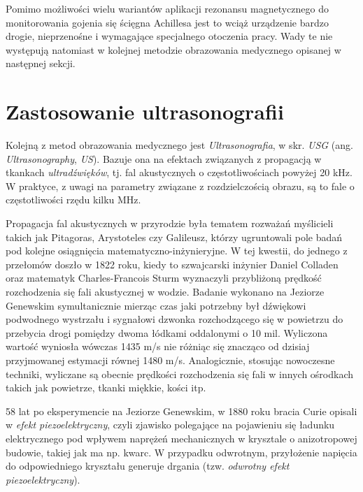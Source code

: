 Pomimo możliwości wielu wariantów aplikacji rezonansu magnetycznego do monitorowania gojenia się ścięgna Achillesa jest to wciąż urządzenie bardzo drogie, nieprzenośne i wymagające specjalnego otoczenia pracy. Wady te nie występują natomiast w kolejnej metodzie obrazowania medycznego opisanej w następnej sekcji. 

\section{Zastosowanie ultrasonografii}

Kolejną z metod obrazowania medycznego jest \textit{Ultrasonografia}, w skr. \textit{USG} (ang. \textit{Ultrasonography}, \textit{US}). Bazuje ona na efektach związanych z propagacją w tkankach \textit{ultradźwięków}, tj. fal akustycznych o częstotliwościach powyżej 20 kHz. W praktyce, z uwagi na parametry związane z rozdzielczością obrazu, są to fale o częstotliwości rzędu kilku MHz.

Propagacja fal akustycznych w przyrodzie była tematem rozważań myślicieli takich jak Pitagoras, Arystoteles czy Galileusz, którzy ugruntowali pole badań pod kolejne osiągnięcia matematyczno-inżynieryjne. W tej kwestii, do jednego z przełomów doszło w 1822 roku, kiedy to szwajcarski inżynier Daniel Colladen oraz matematyk Charles-Francois Sturm wyznaczyli przybliżoną prędkość rozchodzenia się fali akustycznej w wodzie. Badanie wykonano na Jeziorze Genewskim symultanicznie mierząc czas jaki potrzebny był dźwiękowi podwodnego wystrzału i sygnałowi dzwonka rozchodzącego się w powietrzu do przebycia drogi pomiędzy dwoma łódkami oddalonymi o 10 mil. Wyliczona wartość wyniosła wówczas 1435 m/s nie różniąc się znacząco od dzisiaj przyjmowanej estymacji równej 1480 m/s. Analogicznie, stosując nowoczesne techniki, wyliczane są obecnie prędkości rozchodzenia się fali w innych ośrodkach takich jak powietrze, tkanki miękkie, kości itp.

58 lat po eksperymencie na Jeziorze Genewskim, w 1880 roku bracia Curie opisali w \cite{Curie1880} \textit{efekt piezoelektryczny}, czyli zjawisko polegające na pojawieniu się ładunku elektrycznego pod wpływem naprężeń mechanicznych w krysztale o anizotropowej budowie, takiej jak ma np. kwarc. W przypadku odwrotnym, przyłożenie napięcia do odpowiedniego kryształu generuje drgania (tzw. \textit{odwrotny efekt piezoelektryczny}). 

